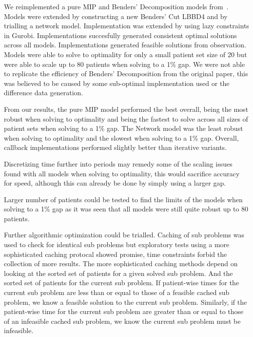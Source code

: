 We reimplemented a pure MIP and Benders' Decomposition models from~\cite{roshanaei2017propagating}. Models were extended by constructing a new Benders' Cut LBBD4 and by trialling a network model. Implementation was extended by using lazy constraints in Gurobi. Implementations succesfully generated consistent optimal solutions across all models. Implementations generated feasible solutions from observation. Models were able to solve to optimality for only a small patient set size of 20 but were able to scale up to 80 patients when solving to a 1\% gap. We were not able to replicate the efficiency of Benders' Decomposition from the original paper, this was believed to be caused by some sub-optimal implementation used or the difference data generation.  

From our results, the pure MIP model performed the best overall, being the most robust when solving to optimality and being the fastest to solve across all sizes of patient sets when solving to a 1\% gap. The Network model was the least robust when solving to optimality and the slowest when solving to a 1\% gap. Overall, callback implementations performed slightly better than iterative variants.

Discretizing time further into periods may remedy some of the scaling issues found with all models when solving to optimality, this would sacrifice accuracy for speed, although this can already be done by simply using a larger gap. 

Larger number of patients could be tested to find the limits of the models when solving to a 1\% gap as it was seen that all models were still quite robust up to 80 patients. 

Further algorithmic optimization could be trialled. Caching of sub problems was used to check for identical sub problems but exploratory tests using a more sophisticated caching protocal showed promise, time constraints forbid the collection of more results. The more sophisticated caching methods depend on looking at the sorted set of patients for a given solved sub problem. And the sorted set of patients for the current sub problem. If patient-wise times for the current sub problem are less than or equal to those of a feasible cached sub problem, we know a feasible solution to the current sub problem. Similarly, if the patient-wise time for the current sub problem are greater than or equal to those of an infeasible cached sub problem, we know the current sub problem must be infeasible.
